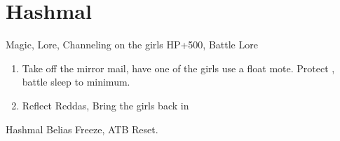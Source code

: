\chapter{Hashmal}

\begin{liscense}
	Magic, Lore, Channeling on the girls
	\vaan HP+500, Battle Lore
\end{liscense}
\begin{enumerate}
	\item Take off the mirror mail, have one of the girls use a float mote. Protect \vaan, battle sleep to minimum.
	\item Reflect Reddas, Bring the girls back in
\end{enumerate}
\begin{gambit}
	\begin{itemize}
	\end{itemize}
\end{gambit}
\begin{battle}{Hashmal}
	Belias Freeze, ATB Reset.
\end{battle}